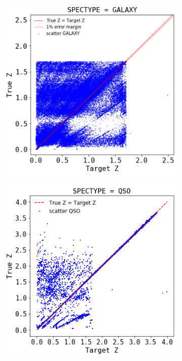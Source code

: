 \begin{figure}
	\centering
	\begin{subfigure}[b]{0.5\textwidth}
		\includegraphics[width=1\linewidth]{TeX_files/Imagenes/GALAXY-z-truez}
		\caption{}
		\label{fig:GALAXY-z-truez} 
	\end{subfigure}    
	\begin{subfigure}[b]{0.5\textwidth}
		\includegraphics[width=1\linewidth]{TeX_files/Imagenes/QSO-z-truez}

\end{subfigure}
\end{figure}
